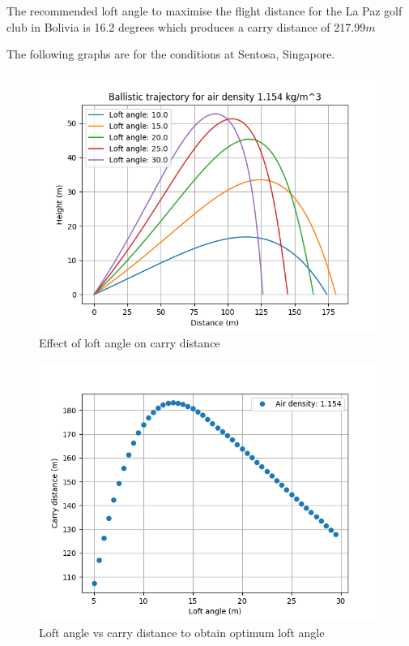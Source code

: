 \documentclass[12pt]{article}
\begin{document}
The recommended loft angle to maximise the flight distance for the La Paz golf club in Bolivia is 16.2 degrees which produces a carry distance of 217.99$m$

The following graphs are for the conditions at Sentosa, Singapore.

\begin{figure}[H]
\centering
\caption{Effect of loft angle on carry distance}
\includegraphics[scale=0.6]{results1154}
\end{figure}

\begin{figure}[H]
\centering
\caption{Loft angle vs carry distance to obtain optimum loft angle}
\includegraphics[scale=0.6]{results1154range}
\end{figure}
\end{document}
